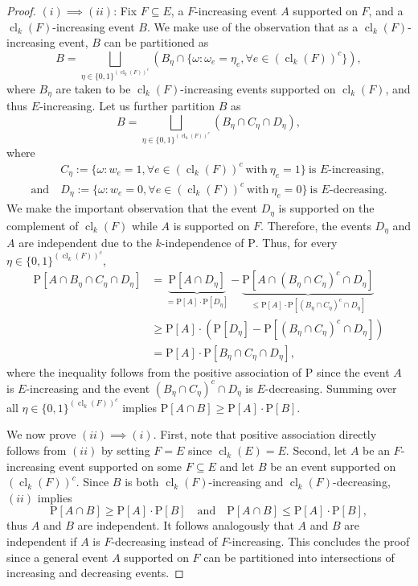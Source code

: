 \documentclass[11pt]{article}
\renewcommand{\P}{\mathrm{P}}
\DeclareMathOperator{\cl}{cl}
\theoremstyle{remark}
\begin{document}
\begin{proof}
\noindent  $(i) \implies (ii)$: Fix $F \subseteq E$, a $F$-increasing event $A$ supported on $F$, and a $\cl_k(F)$-increasing event $B$. 
We make use of the observation that as a $\cl_k(F)$-increasing event, $B$ can be partitioned as
\begin{equation}
	B = \bigsqcup_{\eta \in \{0,1\}^{(\cl_k(F))^c}} \left(  B_\eta \cap \{\omega : \omega_e = \eta_e, \forall e \in (\cl_k(F))^c\} \right),
\end{equation} 
where $B_\eta$ are taken to be $\cl_k(F)$-increasing events  supported on $\cl_k(F)$, and thus $E$-increasing. Let us further partition $B$ as
\begin{equation}
	B =  \bigsqcup_{\eta \in \{0,1\}^{(\cl_k(F))^c}} \left(  B_\eta \cap C_\eta \cap D_\eta\right),
\end{equation}
where 
\begin{align}
	&C_\eta := \{\omega: w_e = 1, \forall e \in (\cl_k(F))^c\ \text{with}\ \eta_e = 1 \}\ \text{is $E$-increasing,} \\
	\text{and}\ &D_\eta := \{\omega: w_e = 0, \forall e \in (\cl_k(F))^c\ \text{with}\ \eta_e = 0 \}\ \text{is $E$-decreasing}.
\end{align}
We make the important observation that the event $D_\eta$ is supported on the complement of $\cl_k(F)$ while $A$ is supported on $F$. Therefore, the events $D_\eta$ and $A$ are independent due to the $k$-independence of $\P$. Thus, for every $\eta \in \{0,1\}^{(\cl_k(F))^c}$,
\begin{align}
	\P[A \cap B_\eta \cap C_\eta \cap D_\eta] &= \underbrace{\P[A \cap D_\eta]}_{=\P[A] \cdot \P[D_\eta]} - \underbrace{\P[A \cap (B_\eta \cap C_\eta)^c \cap D_\eta ]}_{\le \P[A] \cdot \P[(B_\eta \cap C_\eta)^c \cap D_\eta ]} \\
	&\ge \P[A] \cdot \left(\P[D_\eta] - \P[(B_\eta \cap C_\eta)^c \cap D_\eta ]\right) \\
	&= \P[A] \cdot \P[B_\eta \cap C_\eta \cap D_\eta ], 
\end{align}
where the inequality follows from the positive association of $\P$ since the event $A$ is $E$-increasing and the event $(B_\eta \cap C_\eta)^c \cap D_\eta$ is $E$-decreasing. Summing over all $\eta \in \{0,1\}^{(\cl_k(F))^c}$ implies $\P[A \cap B] \ge \P[A]\cdot \P[B]$.

We now prove $(ii) \implies (i)$. First, note that positive association directly follows from $(ii)$ by setting $F=E$ since $\cl_k(E)=E$. Second, let $A$ be an $F$-increasing event supported on some $F \subseteq E$ and let $B$ be an event supported on $(\cl_k(F))^c$. Since $B$ is both $\cl_k(F)$-increasing and $\cl_k(F)$-decreasing, $(ii)$ implies 
\begin{equation}
	\P[A \cap B] \ge \P[A]\cdot \P[B] \quad \text{and} \quad 	\P[A \cap B] \le \P[A]\cdot \P[B],
\end{equation}  
thus $A$ and $B$ are independent. It follows analogously that $A$ and $B$ are independent if $A$ is $F$-decreasing instead of $F$-increasing. This concludes the proof since a general event $A$ supported on $F$ can be partitioned into intersections of increasing and decreasing events. 
\end{proof}
\end{document}
